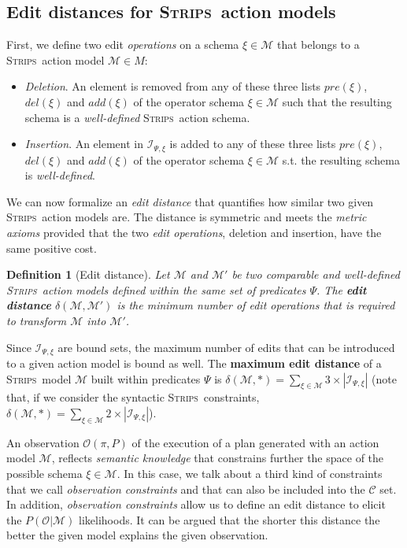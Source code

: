 \documentclass[letterpaper]{article} %
\newcommand{\strips}{\textsc{Strips}}     %
\newtheorem{definition}[theorem]{Definition}
\begin{document}
\subsection{Edit distances for \strips\ action models}
First, we define two edit \emph{operations} on a schema $\xi\in\mathcal{M}$ that belongs to a \strips\ action model $\mathcal{M}\in M$:
\begin{itemize}
\item {\em Deletion}. An element is removed from any of these three lists $pre(\xi)$, $del(\xi)$ and $add(\xi)$ of the operator schema $\xi\in\mathcal{M}$ such that the resulting schema is a {\em well-defined} \strips\ action schema.
\item {\em Insertion}. An element in ${\mathcal I}_{\Psi,\xi}$ is added to any of these three lists $pre(\xi)$, $del(\xi)$ and $add(\xi)$ of the operator schema $\xi\in\mathcal{M}$ s.t. the resulting schema is {\em well-defined}.
\end{itemize}

We can now formalize an {\em edit distance} that quantifies how similar two given \strips\ action models are. The distance is symmetric and meets the {\em metric axioms} provided that the two {\em edit operations}, deletion and insertion, have the same positive cost.

\begin{definition}[Edit distance]
  Let $\mathcal{M}$ and $\mathcal{M}'$ be two {\em comparable} and {\em well-defined} \strips\ action models defined within the same set of predicates $\Psi$. The {\bf edit distance} $\delta(\mathcal{M},\mathcal{M}')$ is the minimum number of {\em edit operations} that is required to transform $\mathcal{M}$ into $\mathcal{M}'$.
\end{definition}

Since ${\mathcal I}_{\Psi,\xi}$ are bound sets, the maximum number of edits that can be introduced to a given action model is bound as well. The \textbf{maximum edit distance} of a \strips\ model $\mathcal{M}$ built within predicates $\Psi$ is $\delta(\mathcal{M},*)=\sum_{\xi\in\mathcal{M}} 3\times|{\mathcal I}_{\Psi,\xi}|$ (note that, if we consider the syntactic \strips\ constraints, $\delta(\mathcal{M},*)=\sum_{\xi\in\mathcal{M}} 2\times|{\mathcal I}_{\Psi,\xi}|$).


An observation $\mathcal{O}(\pi,P)$ of the execution of a plan generated with an action model $\mathcal{M}$, reflects {\em semantic knowledge} that constrains further the space of the possible schema $\xi\in \mathcal{M}$. In this case, we talk about a third kind of constraints that we call {\em observation constraints} and that can also be included into the $\mathcal{C}$ set. In addition, {\em observation constraints} allow us to define an edit distance to elicit the $P(\mathcal{O}|\mathcal{M})$ likelihoods. It can be argued that the shorter this  distance the better the given model explains the given observation.
\end{document}
